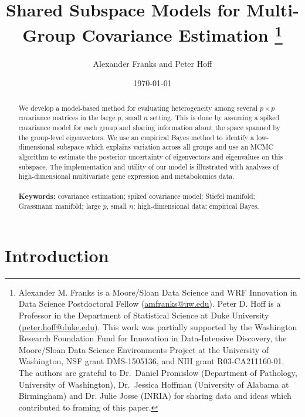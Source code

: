 \documentclass[12pt]{article}
\begin{document}
\title{Shared Subspace Models for Multi-Group Covariance Estimation
%
  \protect\thanks{Alexander M. Franks is a Moore/Sloan Data Science
    and WRF Innovation in Data Science Postdoctoral Fellow
    (\href{mailto:amfranks@uw.edu}{amfranks@uw.edu}).  Peter D. Hoff
    is a Professor in the Department of Statistical Science at Duke University
    (\href{mailto:peter.hoff@duke.edu}{peter.hoff@duke.edu}).
%
This work was partially supported 
 by the Washington Research Foundation Fund for Innovation in
 Data-Intensive Discovery, the Moore/Sloan Data Science Environments
 Project at the University of Washington, NSF grant DMS-1505136, and NIH grant R03-CA211160-01.
%
 The authors are grateful to Dr.\ Daniel Promislow (Department of
 Pathology, University of Washington), Dr.\ Jessica Hoffman
 (University of Alabama at Birmingham) and Dr. Julie Josse (INRIA)
 for sharing data and ideas which contributed to framing of this
 paper.}}  \author{Alexander Franks and Peter Hoff} \date{\today}
\maketitle 

\begin{abstract}

  We develop a model-based method for evaluating heterogeneity among
  several $p\times p$ covariance matrices in the large $p$, small $n$ setting.
  This is done by assuming a spiked covariance model for each group
  and sharing information about the space spanned by the group-level
  eigenvectors.  We use an empirical Bayes method to identify a low-dimensional
  subspace which explains variation across all groups and use an MCMC
  algorithm to estimate the posterior uncertainty of eigenvectors and
  eigenvalues on this subspace.  The implementation and utility of our
  model is illustrated with analyses of high-dimensional multivariate
  gene expression and metabolomics data.
\\
\\
\noindent\textbf{Keywords:} covariance estimation; spiked covariance
model; Stiefel manifold; Grassmann manifold; large $p$, small $n$;
high-dimensional data; empirical Bayes.
\vfill
\end{abstract}

\section{Introduction}
\end{document}
